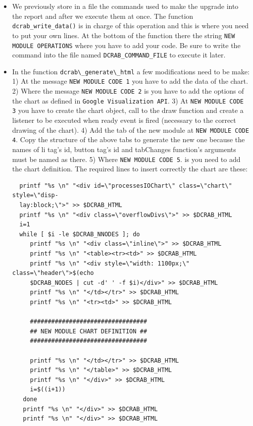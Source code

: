 \documentclass[10pt,a4paper]{report}
\begin{document}
\begin{itemize}
  \item We previously store in a file the commands used to make the upgrade into the report and after we execute them at once. The function \texttt{dcrab\_write\_data()} is in charge of this operation and this is where you need to put your own lines. At the bottom of the function there the string \verb+NEW MODULE OPERATIONS+ where you have to add your code. Be sure to write the command into the file named \verb+DCRAB_COMMAND_FILE+ to execute it later.
  \item In the function \verb+dcrab\_generate\_html+ a few modifications need to be make: 1) At the message \verb+NEW MODULE CODE 1+ you have to add the data of the chart. 2) Where the message \verb+NEW MODULE CODE 2+ is you have to add the options of the chart as defined in \verb+Google Visualization API+. 3) At \verb+NEW MODULE CODE 3+ you have to create the chart object, call to the draw function and create a listener to be executed when ready event is fired (necessary to the correct drawing of the chart). 4) Add the tab of the new module at \verb+NEW MODULE CODE 4+. Copy the structure of the above tabs to generate the new one because the names of li tag's id, button tag's id and tabChanges function's arguments must be named as there. 5) Where \verb+NEW MODULE CODE 5+. is you need to add the chart definition. The required lines to insert correctly the chart are these:

  \begin{verbatim}
  printf "%s \n" "<div id=\"processesIOChart\" class=\"chart\" style=\"disp-
  lay:block;\">" >> $DCRAB_HTML
  printf "%s \n" "<div class=\"overflowDivs\">" >> $DCRAB_HTML
  i=1
  while [ $i -le $DCRAB_NNODES ]; do
     printf "%s \n" "<div class=\"inline\">" >> $DCRAB_HTML
     printf "%s \n" "<table><tr><td>" >> $DCRAB_HTML
     printf "%s \n" "<div style=\"width: 1100px;\" class=\"header\">$(echo
     $DCRAB_NODES | cut -d' ' -f $i)</div>" >> $DCRAB_HTML
     printf "%s \n" "</td></tr>" >> $DCRAB_HTML
     printf "%s \n" "<tr><td>" >> $DCRAB_HTML

     #################################
     ## NEW MODULE CHART DEFINITION ##
     #################################

     printf "%s \n" "</td></tr>" >> $DCRAB_HTML
     printf "%s \n" "</table>" >> $DCRAB_HTML
     printf "%s \n" "</div>" >> $DCRAB_HTML
     i=$((i+1))
   done
   printf "%s \n" "</div>" >> $DCRAB_HTML
   printf "%s \n" "</div>" >> $DCRAB_HTML
\end{verbatim}


\end{itemize}
\end{document}
